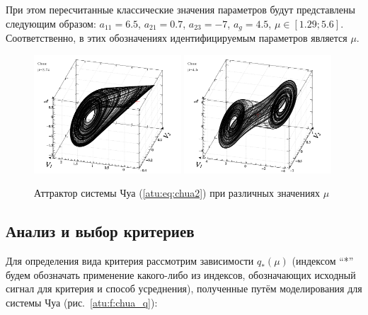 При этом пересчитанные классические значения параметров будут представлены следующим образом:
$ a_{11} = 6.5 $, $a_{21} = 0.7$, $ a_{23} = -7 $, $ a_g = 4.5 $,
$ \mu \in [ 1.29 ; 5.6 ] $.
Соответственно, в этих обозначениях
идентифицируемым параметров является $\mu$.



\begin{figure}[htb!]
\centerline{
  \includegraphics[width=0.49\textwidth]{p/cha/chua/chua_1-p_xyz_mu=2x74.png}
  \includegraphics[width=0.49\textwidth]{p/cha/chua/chua_1-p_xyz_mu=4x50.png}
}
\caption{Аттрактор системы Чуа (\ref{atu:eq:chua2}) при различных значениях $\mu$}
\label{atu:f:chua_phase}
\end{figure}



\subsection{Анализ и выбор критериев}  %


Для определения вида критерия рассмотрим зависимости
$q_{*}(\mu) $ (индексом ``*'' будем обозначать применение какого-либо из индексов,
обозначающих исходный сигнал для критерия и способ усреднения),
полученные путём моделирования
для системы Чуа (рис.~\ref{atu:f:chua_q}):

